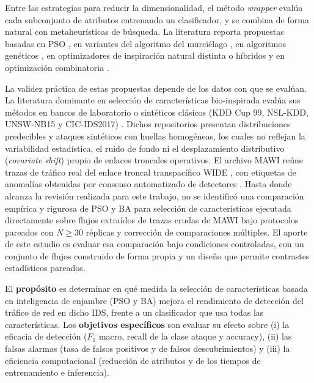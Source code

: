 \documentclass[11pt,a4paper]{article}
\begin{document}
Entre las estrategias para reducir la dimensionalidad, el método \emph{wrapper} evalúa cada subconjunto de atributos entrenando un clasificador, y se combina de forma natural con metaheurísticas de búsqueda. La literatura reporta propuestas basadas en PSO \parencite{srinoy2007,louk2022,safa2024}, en variantes del algoritmo del murciélago \parencite{ghanem2022,saheed2024}, en algoritmos genéticos \parencite{halim2021}, en optimizadores de inspiración natural distinta o híbridos \parencite{vijayanand2020,alzubi2022,hassan2022,varzaneh2024} y en optimización combinatoria \parencite{nazir2021}.

La validez práctica de estas propuestas depende de los datos con que se evalúan. La literatura dominante en selección de características bio-inspirada evalúa sus métodos en bancos de laboratorio o sintéticos clásicos (KDD Cup 99, NSL-KDD, UNSW-NB15 y CIC-IDS2017) \parencite{thakkar2020,alzubi2022,hassan2022,safa2024}. Dichos repositorios presentan distribuciones predecibles y ataques sintéticos con huellas homogéneas, los cuales no reflejan la variabilidad estadística, el ruido de fondo ni el desplazamiento distributivo (\emph{covariate shift}) propio de enlaces troncales operativos. El archivo MAWI reúne trazas de tráfico real del enlace troncal transpacífico WIDE \parencite{mawiarchive}, con etiquetas de anomalías obtenidas por consenso automatizado de detectores \parencite{fontugne2010}. Hasta donde alcanza la revisión realizada para este trabajo, no se identificó una comparación empírica y rigurosa de PSO y BA para selección de características ejecutada directamente sobre flujos extraídos de trazas crudas de MAWI bajo protocolos pareados con $N \ge 30$ réplicas y corrección de comparaciones múltiples. El aporte de este estudio es evaluar esa comparación bajo condiciones controladas, con un conjunto de flujos construido de forma propia y un diseño que permite contrastes estadísticos pareados.

El \textbf{propósito} es determinar en qué medida la selección de características basada en inteligencia de enjambre (PSO y BA) mejora el rendimiento de detección del tráfico de red en dicho IDS, frente a un clasificador que usa todas las características. Los \textbf{objetivos específicos} son evaluar su efecto sobre (i) la eficacia de detección ($F_1$ macro, recall de la clase ataque y accuracy), (ii) las falsas alarmas (tasa de falsos positivos y de falsos descubrimientos) y (iii) la eficiencia computacional (reducción de atributos y de los tiempos de entrenamiento e inferencia).
\end{document}
